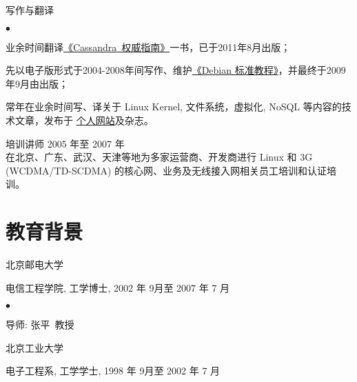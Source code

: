 \documentclass[margin,line]{res}
\newenvironment{list1}{
  \begin{list}{\ding{113}}{%
      \setlength{\itemsep}{0in}
      \setlength{\parsep}{0in} \setlength{\parskip}{0in}
      \setlength{\topsep}{0in} \setlength{\partopsep}{0in} 
      \setlength{\leftmargin}{0.17in}}}{\end{list}}
\newenvironment{list2}{
  \begin{list}{$\bullet$}{%
      \setlength{\itemsep}{0in}
      \setlength{\parsep}{0in} \setlength{\parskip}{0in}
      \setlength{\topsep}{0in} \setlength{\partopsep}{0in} 
      \setlength{\leftmargin}{0.2in}}}{\end{list}}
\begin{document}
\begin{resume}
\textsf{写作与翻译} \\
\vspace*{-.1in}
\begin{list2}
\item 业余时间翻译\href{http://wangxu.me/blog/cassandra-the-definitive-guide}{《Cassandra~权威指南》}一书，已于2011年8月出版；
\item 先以电子版形式于2004-2008年间写作、维护\href{http://wangxu.me/blog/unleashed-debian}{《Debian 标准教程》}，并最终于2009年9月由出版；
\item 常年在业余时间写、译关于 Linux Kernel, 文件系统，虚拟化, NoSQL 等内容的技术文章，发布于 \href{http://wangxu.me/blog/}{个人网站}及杂志。
\end{list2}

\textsf{培训讲师} \hfill \textsf{2005 年至 2007 年}\\
在北京、广东、武汉、天津等地为多家运营商、开发商进行 Linux 和 3G (WCDMA/TD-SCDMA) 的核心网、业务及无线接入网相关员工培训和认证培训。

\section{教育背景}
\textsf{北京邮电大学}\\
\vspace*{-.1in}
\begin{list1}
\item[] 电信工程学院, 工学博士, 2002 年 9月至 2007 年 7 月
\begin{list2}
\vspace*{.05in}
\item 导师: 张平\ 教授
\end{list2}
\end{list1}

\textsf{北京工业大学}\\
\vspace*{-.1in}
\begin{list1}
\item[] 电子工程系, 工学学士, 1998 年 9月至 2002 年 7 月 
\end{list1}


\end{resume}
\end{document}
